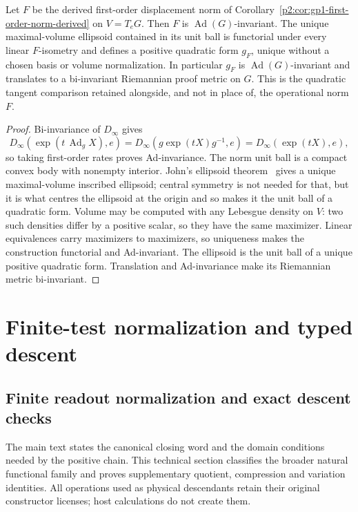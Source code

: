 \documentclass[11pt,a4paper]{article}
\begin{document}
\begin{theorem}
\label{p2:thm:operational-john-metric}
Let \(F\) be the derived first-order displacement norm of
Corollary~\ref{p2:cor:gp1-first-order-norm-derived} on \(V=T_eG\).  Then \(F\) is \(\operatorname{Ad}(G)\)-invariant.  The unique
maximal-volume ellipsoid contained in its unit ball is functorial under every
linear \(F\)-isometry and defines a positive quadratic form \(g_F\), unique
without a chosen basis or volume normalization.  In particular \(g_F\) is
\(\operatorname{Ad}(G)\)-invariant and translates to a bi-invariant
Riemannian proof metric on \(G\).  This is the quadratic tangent comparison
retained alongside, and not in place of, the operational norm \(F\).
\end{theorem}

\begin{proof}
Bi-invariance of \(D_\infty\) gives
\[
 D_\infty(\exp(t\,\operatorname{Ad}_gX),e)
 =D_\infty(g\exp(tX)g^{-1},e)
 =D_\infty(\exp(tX),e),
\]
so taking first-order rates proves Ad-invariance.  The norm unit ball is a
compact convex body with nonempty interior.  John's ellipsoid
theorem~\cite{John1948} gives a unique maximal-volume inscribed ellipsoid;
central symmetry is not needed for that, but it is what centres the ellipsoid
at the origin and so makes it the unit ball of a quadratic form.  Volume
may be computed with any Lebesgue density on \(V\): two such densities differ
by a positive scalar, so they have the same maximizer.  Linear
equivalences carry maximizers to maximizers, so uniqueness makes the
construction functorial and Ad-invariant.  The ellipsoid is the unit ball of a
unique positive quadratic form.  Translation and Ad-invariance make its
Riemannian metric bi-invariant.
\end{proof}


\section{Finite-test normalization and typed descent}
\label{p2f:sec:finite-test-descent}
\subsection{Finite readout normalization and exact descent checks}
\label{p2a:app:repair-normalization-descent}
The main text states the canonical closing word and the domain conditions
needed by the positive chain. This technical section classifies the broader natural
functional family and proves supplementary quotient, compression and
variation identities. All operations used as physical descendants retain
their original constructor licenses; host calculations do not create them.
\end{document}
